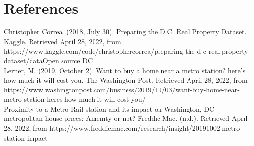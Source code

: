 \documentclass[12pt]{report}
\newcommand\tab[1][.60cm]{\hspace*{#1}}
\begin{document}
\section*{References}

\tab Christopher Correa. (2018, July 30). Preparing the D.C. Real Property Dataset. Kaggle. Retrieved April 28, 2022, from https://www.kaggle.com/code/christophercorrea/preparing-the-d-c-real-property-dataset/dataOpen source DC\\

Lerner, M. (2019, October 2). Want to buy a home near a metro station? here's how much it will cost you. The Washington Post. Retrieved April 28, 2022, from https://www.washingtonpost.com/business/2019/10/03/want-buy-home-near-metro-station-heres-how-much-it-will-cost-you/\\

Proximity to a Metro Rail station and its impact on Washington, DC metropolitan house prices: Amenity or not? Freddie Mac. (n.d.). Retrieved April 28, 2022, from https://www.freddiemac.com/research/insight/20191002-metro-station-impact\\
\end{document}
